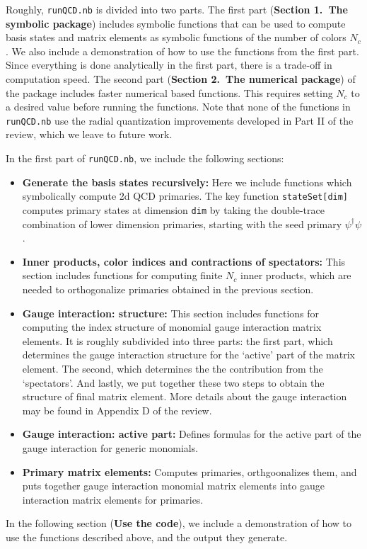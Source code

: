 \documentclass[12pt]{article}
\newcommand{\dagg}{\dagger}
\begin{document}
Roughly, {\tt runQCD.nb} is divided into two parts. The first part (\textbf{Section 1.\ The symbolic package}) includes symbolic functions that can be used to compute basis states and matrix elements as symbolic functions of the number of colors $N_c$. We also include a demonstration of how to use the functions from the first part. Since everything is done analytically in the first part, there is a trade-off in computation speed. The second part (\textbf{Section 2.\ The numerical package}) of the package includes faster numerical based functions. This requires setting $N_c$ to a desired value before running the functions. Note that none of the functions in {\tt runQCD.nb} use the radial quantization improvements developed in Part II of the review, which we leave to future work.

In the first part of {\tt runQCD.nb}, we include the following sections:
\begin{itemize}
  \item \textbf{Generate the basis states recursively:} Here we include functions which symbolically compute 2d QCD primaries. The key function {\tt stateSet[dim]} computes primary states at dimension {\tt dim} by taking the double-trace combination of lower dimension primaries, starting with the seed primary $\psi^\dagg \psi$.
  \item \textbf{Inner products, color indices and contractions of spectators:} This section includes functions for computing finite $N_c$ inner products, which are needed to orthogonalize primaries obtained in the previous section. 
  \item \textbf{Gauge interaction: structure:} This section includes functions for computing the index structure of monomial gauge interaction matrix elements. It is roughly subdivided into three parts: the first part, which determines the gauge interaction structure for the `active' part of the matrix element. The second, which determines the the contribution from the `spectators'. And lastly, we put together these two steps to obtain the structure of final matrix element. More details about the gauge interaction may be found in Appendix D of the review.
  \item \textbf{Gauge interaction: active part:} Defines formulas for the active part of the gauge interaction for generic monomials.
  \item \textbf{Primary matrix elements:} Computes primaries, orthgoonalizes them, and puts together gauge interaction monomial matrix elements into gauge interaction matrix elements for primaries.
\end{itemize} In the following section (\textbf{Use the code}), we include a demonstration of how to use the functions described above, and the output they generate.
\end{document}
